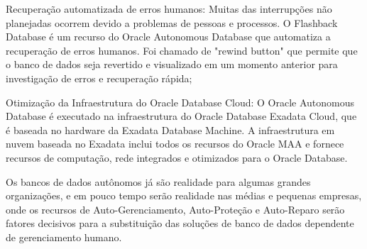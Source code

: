 \begin{alineas}
\item Recuperação automatizada de erros humanos: Muitas das interrupções não planejadas ocorrem devido a problemas de pessoas e processos. O Flashback Database é um recurso do Oracle Autonomous Database que automatiza a recuperação de erros humanos. Foi chamado de "rewind button" que permite que o banco de dados seja revertido e visualizado em um momento anterior para investigação de erros e recuperação rápida;

\item Otimização da Infraestrutura do Oracle Database Cloud: O Oracle Autonomous Database é executado na infraestrutura do Oracle Database Exadata Cloud, que é baseada no hardware da Exadata Database Machine. A infraestrutura em nuvem baseada no Exadata inclui todos os recursos do Oracle MAA e fornece recursos de computação, rede integrados e otimizados para o Oracle Database.
\end{alineas} 


Os bancos de dados autônomos já são realidade para algumas grandes organizações, e em pouco tempo serão realidade nas médias e pequenas empresas, onde os recursos de Auto-Gerenciamento, Auto-Proteção e Auto-Reparo serão fatores decisivos para a substituição das soluções de banco de dados dependente de gerenciamento humano.




